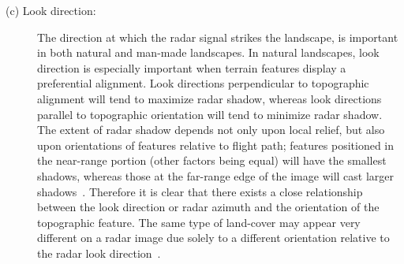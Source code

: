 \begin{description}
	\item[(c) Look direction: ]The direction at which the radar signal strikes the landscape, is important in both natural and man-made landscapes. In natural landscapes, look direction is especially important when terrain features display a preferential alignment. Look directions perpendicular to topographic alignment will tend to maximize radar shadow, whereas look directions parallel to topographic orientation will tend to minimize radar shadow. The extent of radar shadow depends not only upon local relief, but also upon orientations of features relative to flight path; features positioned in the near-range portion (other factors being equal) will have the smallest shadows, whereas those at the far-range edge of the image will cast larger shadows~\citep{campbell2002introduction}. Therefore it is clear that there exists a close relationship between the look direction or radar azimuth and the orientation of the topographic feature. The same type of land-cover may appear very different on a radar image due solely to a different orientation relative to the radar look direction~\citep{bryan1979effect,grey2003mapping}.
\end{description}

